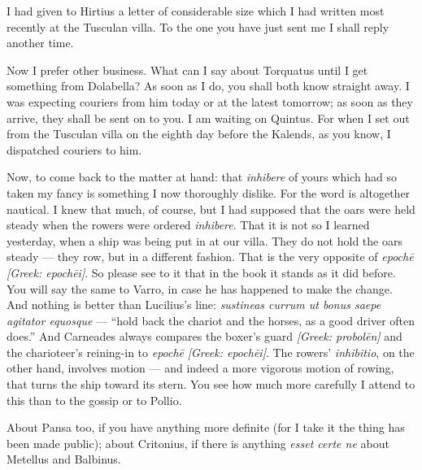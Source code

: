 

 I had given to Hirtius a letter of considerable size which I had written most recently at the Tusculan villa. To the one you have just sent me I shall reply another time.

 Now I prefer other business. What can I say about Torquatus until I get something from Dolabella? As soon as I do, you shall both know straight away. I was expecting couriers from him today or at the latest tomorrow; as soon as they arrive, they shall be sent on to you. I am waiting on Quintus. For when I set out from the Tusculan villa on the eighth day before the Kalends, as you know, I dispatched couriers to him.

 Now, to come back to the matter at hand: that \textit{inhibere} of yours which had so taken my fancy is something I now thoroughly dislike. For the word is altogether nautical. I knew that much, of course, but I had supposed that the oars were held steady when the rowers were ordered \textit{inhibere}. That it is not so I learned yesterday, when a ship was being put in at our villa. They do not hold the oars steady --- they row, but in a different fashion. That is the very opposite of \textit{epoch\=e} \textit{[Greek: epoch\=ei]}. So please see to it that in the book it stands as it did before. You will say the same to Varro, in case he has happened to make the change. And nothing is better than Lucilius's line: \textit{sustineas currum ut bonus saepe agitator equosque} --- ``hold back the chariot and the horses, as a good driver often does.'' And Carneades always compares the boxer's guard \textit{[Greek: probol\=en]} and the charioteer's reining-in to \textit{epoch\=e} \textit{[Greek: epoch\=ei]}. The rowers' \textit{inhibitio}, on the other hand, involves motion --- and indeed a more vigorous motion of rowing, that turns the ship toward its stern. You see how much more carefully I attend to this than to the gossip or to Pollio.

 About Pansa too, if you have anything more definite (for I take it the thing has been made public); about Critonius, if there is anything \dag{}\textit{esset certe ne}\dag{} about Metellus and Balbinus.
